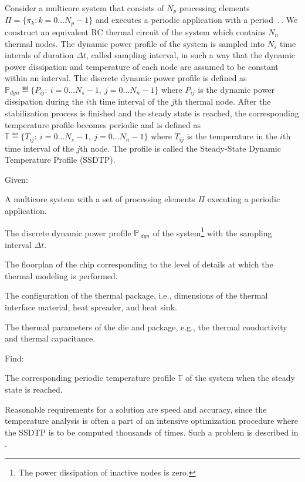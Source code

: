 Consider a multicore system that consists of $N_p$ processing elements $\Pi = \{ \pi_k: k = 0 \dots N_p - 1 \}$ and executes a periodic application with a period $\period$. We construct an equivalent RC thermal circuit of the system which contains $N_n$ thermal nodes. The dynamic power profile of the system is sampled into $N_s$ time interals of duration $\Delta t$, called sampling interval, in such a way that the dynamic power dissipation and temperature of each node are assumed to be constant within an interval. The discrete dynamic power profile is defined as $\mathbb{P}_{dyn} \eqdef \{ P_{ij}: \: i = 0 \dots N_s - 1, \: j = 0 \dots N_n - 1 \}$ where $P_{ij}$ is the dynamic power dissipation during the $i$th time interval of the $j$th thermal node. After the stabilization process is finished and the steady state is reached, the corresponding temperature profile becomes periodic and is defined as $\mathbb{T} \eqdef \{ T_{ij}: \: i = 0 \dots N_s - 1, \: j = 0 \dots N_n - 1 \}$ where $T_{ij}$ is the temperature in the $i$th time interval of the $j$th node. The profile is called the Steady-State Dynamic Temperature Profile (SSDTP).

Given:
\begin{ilist}
  \item A multicore system with a set of processing elements $\Pi$ executing a periodic application.
  \item The discrete dynamic power profile $\mathbb{P}_{\:dyn}$ of the system\footnote{The power dissipation of inactive nodes is zero.} with the sampling interval $\Delta t$.
  \item The floorplan of the chip corresponding to the level of details at which the thermal modeling is performed.
  \item The configuration of the thermal package, i.e., dimensions of the thermal interface material, heat spreader, and heat sink.
  \item The thermal parameters of the die and package, e.g., the thermal conductivity and thermal capacitance.
\end{ilist}

Find:
\begin{ilist}
  \item The corresponding periodic temperature profile $\mathbb{T}$ of the system when the steady state is reached.
\end{ilist}

Reasonable requirements for a solution are speed and accuracy, since the temperature analysis is often a part of an intensive optimization procedure where the SSDTP is to be computed thousands of times. Such a problem is described in .
